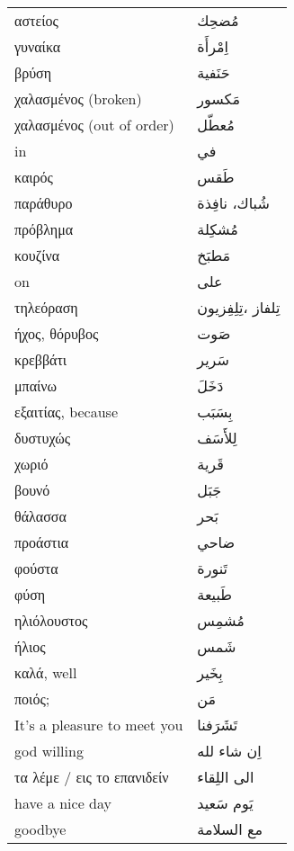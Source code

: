 \documentclass[twocolumn,a4paper]{article}
\newcommand{\ar}[1]{\textarabic{#1}}
\begin{document}
\begin{mpsupertabular}{ P{0.5\textwidth} P{0.5\textwidth} }
αστείος              & \ar{ مُضحِك } \\
γυναίκα              & \ar{ اِمْرأَة } \\
βρύση                & \ar{ حَنَفية } \\
χαλασμένος (broken)  & \ar{ مَكسور } \\
χαλασμένος (out of order)  & \ar{ مُعطّل } \\
in                   & \ar{ في } \\
καιρός               & \ar{ طَقس } \\
παράθυρο             & \ar{ شُباك، نافِذة } \\
πρόβλημα             & \ar{ مُشكِلة } \\
κουζίνα              & \ar{ مَطبَخ } \\
on                   & \ar{ على } \\
τηλεόραση            & \ar{  تِلفاز ،تِلِفِزيون } \\
ήχος, θόρυβος        & \ar{ صَوت } \\
κρεββάτι             & \ar{ سَرير } \\
μπαίνω               & \ar{ دَخَلَ } \\
εξαιτίας, because    & \ar{ بِسَبَب } \\
δυστυχώς             & \ar{ لِلأَسَف } \\
χωριό                & \ar{ قَرية } \\
βουνό                & \ar{ جَبَل } \\
θάλασσα              & \ar{ بَحر } \\
προάστια             & \ar{ ضاحي } \\
φούστα               & \ar{ تَنورة } \\
φύση                 & \ar{ طَبيعة } \\
ηλιόλουστος          & \ar{ مُشمِس } \\
ήλιος                & \ar{ شَمس } \\
καλά, well           & \ar{ بِخَير } \\
ποιός;               & \ar{ مَن } \\
It's a pleasure to meet you        & \ar{ تَشَرَفنا } \\
god willing                        & \ar{ اِن شاء لله } \\
τα λέμε / εις το επανιδείν         & \ar{ الى اللِقاء } \\
have a nice day                    & \ar{ يَوم سَعيد } \\
goodbye              & \ar{ مع السلامة } \\

\end{mpsupertabular}
\end{document}
